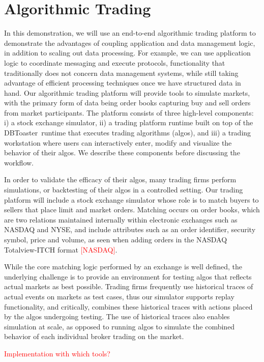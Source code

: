 \documentclass{vldb}
\newcommand{\tinysection}[1]{\noindent{\bf #1.}}
\newcommand{\todo}[1]{\textcolor{red}{#1}}
\newcommand{\compiler}{DBToaster}
\begin{document}
\section{Algorithmic Trading}
In this demonstration, we will use an end-to-end algorithmic trading platform to
demonstrate the advantages of coupling application and data management logic, in
addition to scaling out data processing. For example, we can use application
logic to coordinate messaging and execute protocols, functionality that
traditionally does not concern data management systems, while still taking
advantage of efficient processing techniques once we have structured data in
hand. Our algorithmic trading platform will provide tools to simulate markets,
with the primary form of data being order books capturing buy and sell orders
from market participants. The platform consists of three high-level components:
i) a stock exchange simulator, ii) a trading platform runtime built on top of
the \compiler\ runtime that executes trading algorithms (algos), and iii) a
trading workstation where users can interactively enter, modify and visualize
the behavior of their algos. We describe these components before discussing the
workflow.

\tinysection{Stock exchange simulator} In order to validate the efficacy of
their algos, many trading firms perform simulations, or backtesting of their
algos in a controlled setting. Our trading platform will include a stock
exchange simulator whose role is to match buyers to sellers that place limit
and market orders. Matching occurs on order books, which are two relations
maintained internally within electronic exchanges such as NASDAQ and NYSE, and
include attributes such as an order identifier, security symbol, price and
volume, as seen when adding orders in the NASDAQ Totalview-ITCH format
\todo{[NASDAQ]}.

While the core matching logic performed by an exchange is well defined, the
underlying challenge is to provide an environment for testing algos that
reflects actual markets as best possible. Trading firms frequently use
historical traces of actual events on markets as test cases, thus our simulator
supports replay functionality, and critically, combines these historical traces
with actions placed by the algos undergoing testing. The use of historical
traces also enables simulation at scale, as opposed to running algos to simulate
the combined behavior of each individual broker trading on the market.

\todo{Implementation with which tools?}
\end{document}
